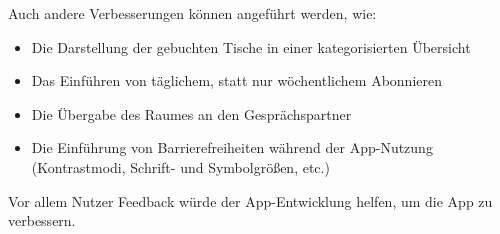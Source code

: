 Auch andere Verbesserungen können angeführt werden, wie:

\begin{itemize}
    \item	Die Darstellung der gebuchten Tische in einer kategorisierten Übersicht
    \item	Das Einführen von täglichem, statt nur wöchentlichem Abonnieren
    \item	Die Übergabe des Raumes an den Gesprächspartner
    \item	Die Einführung von Barrierefreiheiten während der App-Nutzung (Kontrastmodi, Schrift- und Symbolgrößen, etc.)
\end{itemize}

Vor allem Nutzer Feedback würde der App-Entwicklung helfen, um die App zu verbessern.